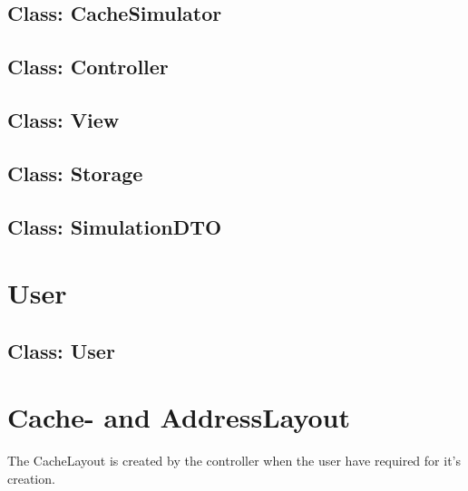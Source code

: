 \documentclass[a4paper]{scrreprt}
\begin{document}
\subsection{Class: CacheSimulator}
\label{subsec:cachesimulator.java}


\subsection{Class: Controller}
\label{subsec:controller.java}


\subsection{Class: View}
\label{subsec:view.java}


\subsection{Class: Storage}
\label{subsec:storage.java}


\subsection{Class: SimulationDTO}
\label{subsec:simulationdto.java}


\section{User}
\label{sec:user}

\subsection{Class: User}
\label{subsec:user.java}


\section{Cache- and AddressLayout}
\label{sec:cache}

The CacheLayout is created by the controller when the user have required for it's creation.
\end{document}
